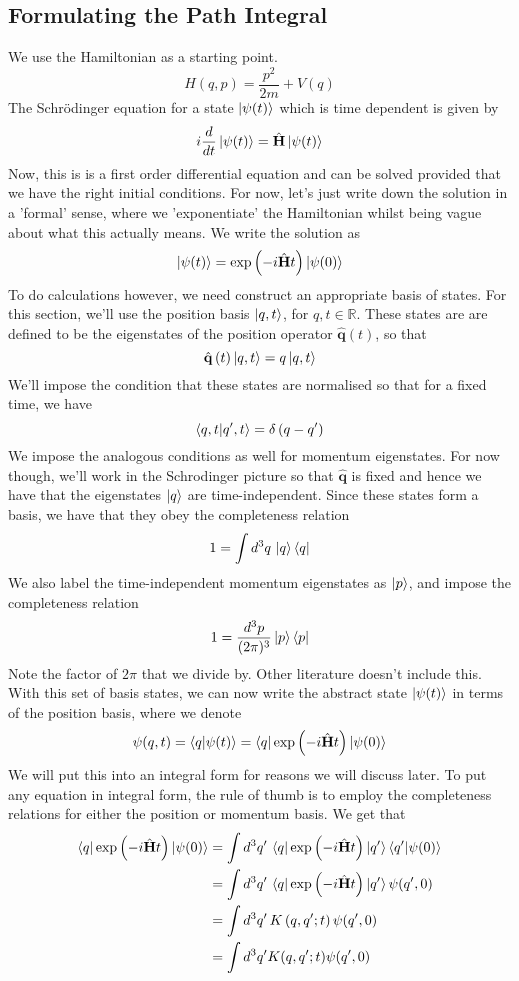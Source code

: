 \documentclass[11pt, oneside]{article}   	%
\theoremstyle{slanted}
\renewcommand{\op}[1]{\hat{\mathbf{#1}}}
\begin{document}
\subsection{Formulating the Path Integral} 
We use the Hamiltonian 
as a starting point. 
\[
	H ( q, p ) = \frac{p ^ 2 }{ 2m } + V ( q ) 
\] The Schrödinger equation for 
a state $ \ket{ \psi ( t ) } $ which is time dependent 
is given by 
\[
	i \frac{ d }{ dt } \ket{ \psi ( t ) }  = \op{H }  \ket{ \psi ( t ) } 
\] Now, this is 
is a first order differential equation 
and can be solved provided that 
we have the right initial conditions. 
For now, let's just write down the solution 
in a 'formal' sense, where we 'exponentiate' 
the Hamiltonian whilst being vague 
about what this actually means. 
We write the solution as 
\[
	\ket{ \psi ( t ) } = \exp\left(  - i \op{ H } t  \right)  
	\ket{ \psi ( 0 ) } 
\] To do calculations however, we 
need construct an appropriate basis of states.
For this section, we'll use 
the position basis $ \ket{ q , t } $, for 
$ q, t  \in \mathbb{ R } $. These states are 
are defined to be the eigenstates of 
the position operator $ \op{q} \left( t  \right)  $, 
so that 
\[
	\op{q } \left( t   \right) \ket{ q , t }  = q \ket { q , t }   
\] We'll impose the condition 
that these states are normalised 
so that for a fixed time, we have 
\[
 \bra{q , t}\ket{ q ' , t } = \delta \left( q - q '  \right) 
\] We impose the analogous conditions as 
well for momentum eigenstates. For now though, we'll work in 
the Schrodinger picture so that $ \op{q } $ is fixed
and hence we have that the eigenstates $ \ket{ q } $ 
are time-independent. Since these states form 
a basis, we have that they obey the completeness 
relation 
\[
	1 = \int d ^ 3 q \, \ket{ q }\bra{ q } 
\] We also label the time-independent 
momentum eigenstates as $ \ket{ p } $, 
and impose the completeness relation 
\[
	1 = \frac{ d ^ 3 p }{ ( 2 \pi )^{ 3 }  } \ket{ p } \bra{ p } 
\] Note the factor of $ 2 \pi $ that we divide by. 
Other literature doesn't include this. 
With this set of basis states, we can 
now write the abstract state $ \ket{ \psi( t ) } $ 
in terms of the position basis, where we denote 
\[
	\psi ( q, t ) = \bra{ q}\ket{ \psi  ( t ) } 
	=  \bra{q } \exp\left(  - i \op{H }t  \right)\ket{ \psi ( 0 ) } 
\] We will put this into an integral form 
for reasons we will discuss later. 
To put any equation in integral 
form, the rule of thumb is 
to employ the completeness relations 
for either the position or momentum basis.
We get that 
\begin{align*}
	\bra{ q } \exp\left( - i \op{ H } t  \right) \ket{ \psi ( 0 ) } &=  \int d ^ 3 q '\,  \bra{ q }\exp \left(  - i \op{ H } t  \right)\ket{ q ' } \bra{ q ' }\ket{\psi ( 0 )}    \\ 
									&=  \int d ^ 3 q '\,  \bra{q}\exp \left(  - i \op{H } t  \right) \ket{ q' }\psi ( q' , 0 )  \\ 							&=  \int  d ^ 3 q' \, K \left( q, q' ; t  \right)  \psi ( q' , 0 )  \\
									&=  \int d ^ 3  q ' K ( q , q ' ; t ) \psi ( q ' , 0 )  
\end{align*}  
\end{document}
